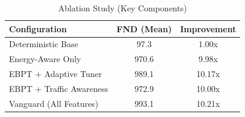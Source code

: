 \begin{table}[h]
\centering
\caption{Ablation Study (Key Components)}
\begin{tabular}{|l|c|c|}
\hline
\textbf{Configuration} & \textbf{FND (Mean)} & \textbf{Improvement} \\ \hline
Deterministic Base & 97.3 & 1.00x \\ 
Energy-Aware Only & 970.6 & 9.98x \\ 
EBPT + Adaptive Tuner & 989.1 & 10.17x \\ 
EBPT + Traffic Awareness & 972.9 & 10.00x \\ 
Vanguard (All Features) & 993.1 & 10.21x \\ 
 \hline 
\end{tabular}
\end{table}